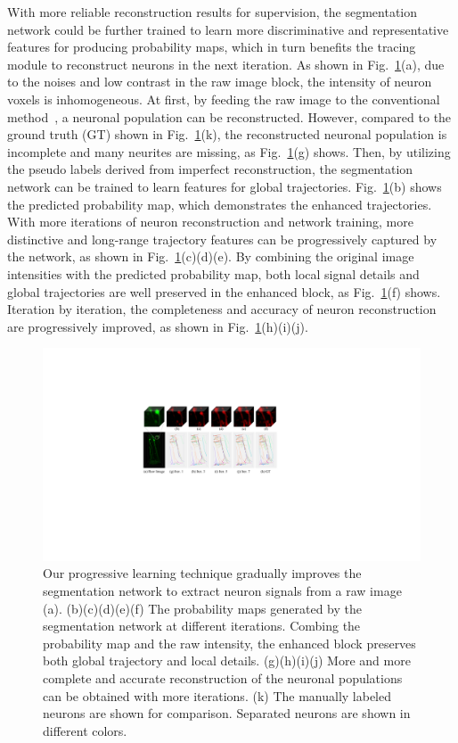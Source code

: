 With more reliable reconstruction results for supervision, the segmentation network could be further trained to learn more discriminative and representative features for producing probability maps, which in turn benefits the tracing module to reconstruct neurons in the next iteration.
%
As shown in Fig.~\ref{fig:ngps}(a), due to the noises and low contrast in the raw image block, the intensity of neuron voxels is inhomogeneous.
At first, by feeding the raw image to the conventional method~\cite{Quan2015}, a neuronal population can be reconstructed. However, compared to the ground truth (GT) shown in Fig.~\ref{fig:ngps}(k), the reconstructed neuronal population is incomplete and many neurites are missing, as Fig.~\ref{fig:ngps}(g) shows.
Then, by utilizing the pseudo labels derived from imperfect reconstruction, the segmentation network can be trained to learn features for global trajectories. Fig.~\ref{fig:ngps}(b) shows the predicted probability map, which demonstrates the enhanced trajectories.
With more iterations of neuron reconstruction and network training, more distinctive and long-range trajectory features can be progressively captured by the network, as shown in Fig.~\ref{fig:ngps}(c)(d)(e).
By combining the original image intensities with the predicted probability map, both local signal details and global trajectories are well preserved in the enhanced block, as Fig.~\ref{fig:ngps}(f) shows.
Iteration by iteration, the completeness and accuracy of neuron reconstruction are progressively improved, as shown in Fig.~\ref{fig:ngps}(h)(i)(j).


\begin{figure}[t]
	\centering
	\includegraphics[width=1\columnwidth]{./Illustrations/ngps.pdf}
	\caption{Our progressive learning technique gradually improves the segmentation network to extract neuron signals from a raw image (a). (b)(c)(d)(e)(f) The probability maps generated by the segmentation network at different iterations.  Combing the probability map and the raw intensity, the enhanced block preserves both global trajectory and local details. (g)(h)(i)(j) More and more complete and accurate reconstruction of the neuronal populations can be obtained with more iterations. (k) The manually labeled neurons are shown for comparison. Separated neurons are shown in different colors.}
	\label{fig:ngps}
\end{figure}
%

